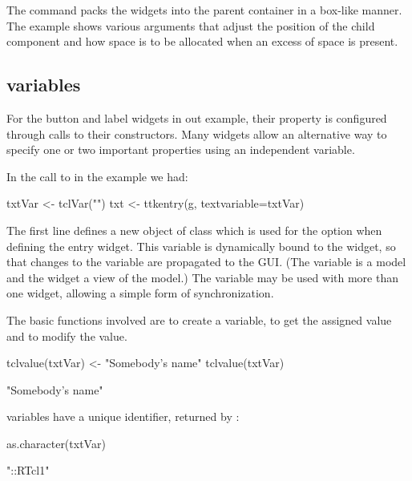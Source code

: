 The  command packs the widgets into the parent container
in a box-like manner. The example shows various arguments that adjust
the position of the child component and how space is to be allocated
when an excess of space is present.



\subsection{\TCL\/ variables}
\label{sec:tcltk:overview:textvariables}


For the button and label widgets in out example, their 
property is configured through calls to their constructors. Many
widgets allow an alternative way to specify one or two important
properties using an independent \Tcl\/ variable.

In the call to  in the example we had:

\begin{Schunk}
\begin{Sinput}
 txtVar <- tclVar("")
 txt <- ttkentry(g, textvariable=txtVar)
\end{Sinput}
\end{Schunk}
%
The first line defines a new object of class  which is
used for the  option when defining the entry
widget. This variable is dynamically bound to the widget, so that
changes to the variable are propagated to the GUI. (The \TCL\/
variable is a model and the widget a view of the model.)  The \Tcl{}
variable may be used with more than one widget, allowing a simple form
of synchronization.

The basic functions involved are  to create a \TCL\/
variable,  to get the assigned value and
 to modify the value.

\begin{Schunk}
\begin{Sinput}
 tclvalue(txtVar) <- "Somebody's name"
 tclvalue(txtVar)
\end{Sinput}
\begin{Soutput}
[1] "Somebody's name"
\end{Soutput}
\end{Schunk}

\TCL\/ variables have a unique identifier, returned by :
\begin{Schunk}
\begin{Sinput}
 as.character(txtVar)
\end{Sinput}
\begin{Soutput}
[1] "::RTcl1"
\end{Soutput}
\end{Schunk}

